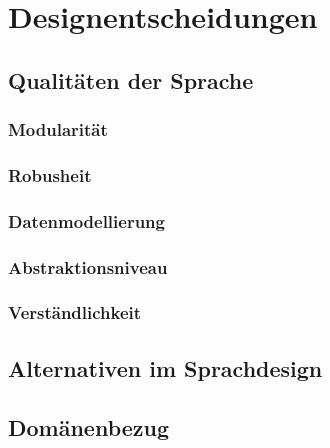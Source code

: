 
\chapter{Designentscheidungen}
\label{cha:designentscheidungen}

\section{Qualitäten der Sprache} %
\label{sec:qualitaten_der_sprache}


\subsection{Modularität} %
\label{sub:modularitat}

\subsection{Robusheit} %
\label{sub:robusheit}

\subsection{Datenmodellierung} %
\label{sub:datenmodellierung}

\subsection{Abstraktionsniveau} %
\label{sub:abstraktionsniveau}

\subsection{Verständlichkeit} %
\label{sub:verstandlichkeit}



\section{Alternativen im Sprachdesign} %
\label{sec:alternativen_im_sprachdesign}


\section{Domänenbezug} %
\label{sec:domanenbezug}

